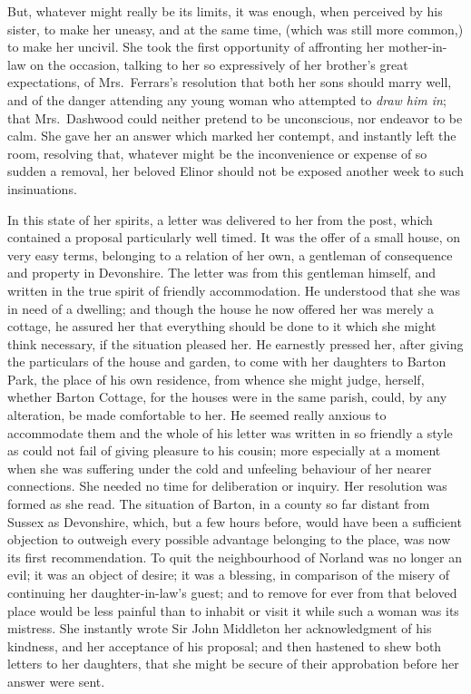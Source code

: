 \documentclass{article}
\begin{document}
But, whatever might really be its limits, it was enough,
when perceived by his sister, to make her uneasy,
and at the same time, (which was still more common,)
to make her uncivil.  She took the first opportunity of
affronting her mother-in-law on the occasion, talking to
her so expressively of her brother's great expectations,
of Mrs.\ Ferrars's resolution that both her sons should
marry well, and of the danger attending any young woman
who attempted to \emph{draw him in}; that Mrs.\ Dashwood could
neither pretend to be unconscious, nor endeavor to be calm.
She gave her an answer which marked her contempt,
and instantly left the room, resolving that, whatever might
be the inconvenience or expense of so sudden a removal,
her beloved Elinor should not be exposed another week
to such insinuations.

In this state of her spirits, a letter was delivered
to her from the post, which contained a proposal
particularly well timed.  It was the offer of a small house,
on very easy terms, belonging to a relation of her own,
a gentleman of consequence and property in Devonshire.
The letter was from this gentleman himself, and written
in the true spirit of friendly accommodation.
He understood that she was in need of a dwelling;
and though the house he now offered her was merely a cottage,
he assured her that everything should be done to it which
she might think necessary, if the situation pleased her.
He earnestly pressed her, after giving the particulars
of the house and garden, to come with her daughters to
Barton Park, the place of his own residence, from whence
she might judge, herself, whether Barton Cottage, for the
houses were in the same parish, could, by any alteration,
be made comfortable to her.  He seemed really anxious to
accommodate them and the whole of his letter was written
in so friendly a style as could not fail of giving pleasure
to his cousin; more especially at a moment when she was
suffering under the cold and unfeeling behaviour of her
nearer connections.  She needed no time for deliberation
or inquiry.  Her resolution was formed as she read.
The situation of Barton, in a county so far distant from
Sussex as Devonshire, which, but a few hours before,
would have been a sufficient objection to outweigh every
possible advantage belonging to the place, was now its
first recommendation.  To quit the neighbourhood of Norland
was no longer an evil; it was an object of desire;
it was a blessing, in comparison of the misery of continuing
her daughter-in-law's guest; and to remove for ever
from that beloved place would be less painful than to
inhabit or visit it while such a woman was its mistress.
She instantly wrote Sir John Middleton her acknowledgment
of his kindness, and her acceptance of his proposal;
and then hastened to shew both letters to her daughters,
that she might be secure of their approbation before her
answer were sent.
\end{document}
